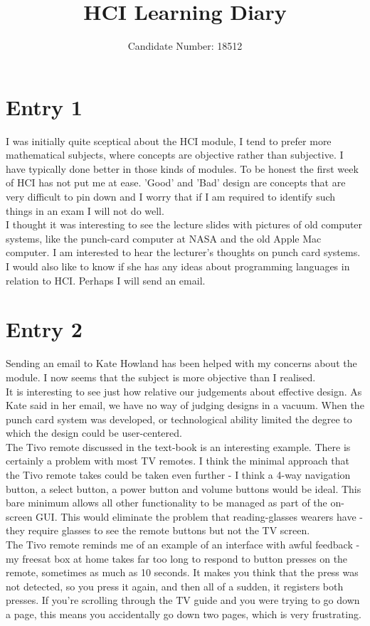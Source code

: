 \documentclass{article}
\title{HCI Learning Diary}
\author{Candidate Number: 18512}
\begin{document}
\maketitle
\section*{Entry 1}

\noindent I was initially quite sceptical about the HCI module, I tend to prefer more mathematical subjects, where concepts are objective rather than subjective. I have typically done better in those kinds of modules. To be honest the first week of HCI has not put me at ease. 'Good' and 'Bad' design are concepts that are very difficult to pin down and I worry that if I am required to identify such things in an exam I will not do well.
\\\indent I thought it was interesting to see the lecture slides with pictures of old computer systems, like the punch-card computer at NASA and the old Apple Mac computer. I am interested to hear the lecturer's thoughts on punch card systems. I would also like to know if she has any ideas about programming languages in relation to HCI. Perhaps I will send an email.

\section*{Entry 2}

\noindent Sending an email to Kate Howland has been helped with my concerns about the module. I now seems that the subject is more objective than I realised.
\\\indent It is interesting to see just how relative our judgements about effective design. As Kate said in her email, we have no way of judging designs in a vacuum. When the punch card system was developed, or technological ability limited the degree to which the design could be user-centered.
\\\indent The Tivo remote discussed in the text-book is an interesting example. There is certainly a problem with most TV remotes. I think the minimal approach that the Tivo remote takes could be taken even further - I think a 4-way navigation button, a select button, a power button and volume buttons would be ideal. This bare minimum allows all other functionality to be managed as part of the on-screen GUI. This would eliminate the problem that reading-glasses wearers have - they require glasses to see the remote buttons but not the TV screen.
\\\indent The Tivo remote reminds me of an example of an interface with awful feedback - my freesat box at home takes far too long to respond to button presses on the remote, sometimes as much as 10 seconds. It makes you think that the press was not detected, so you press it again, and then all of a sudden, it registers both presses. If you're scrolling through the TV guide and you were trying to go down a page, this means you accidentally go down two pages, which is very frustrating.
\end{document}
